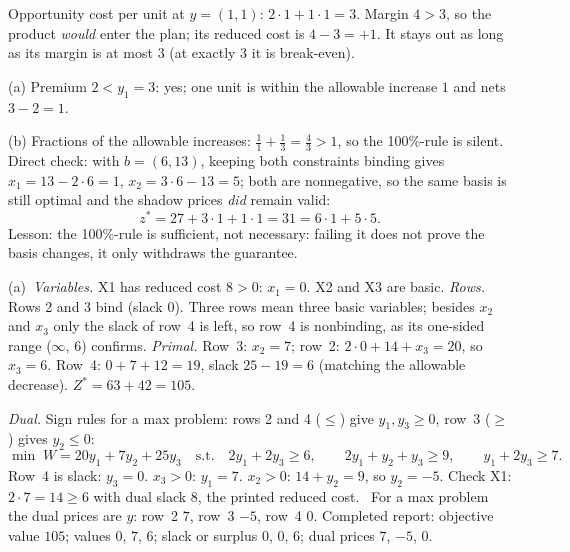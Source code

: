 \begin{solutions}
  \item Opportunity cost per unit at $y=(1,1)$:
        $2\cdot1+1\cdot1=3$. Margin $4>3$, so the product \emph{would}
        enter the plan; its reduced cost is $4-3=+1$. It stays out as
        long as its margin is at most $3$ (at exactly $3$ it is
        break-even).

  \item (a) Premium $2<y_{1}=3$: yes; one unit is within the allowable
        increase $1$ and nets $3-2=1$.

        (b) Fractions of the allowable increases:
        $\tfrac11+\tfrac13=\tfrac43>1$, so the 100\%-rule is silent.
        Direct check: with $b=(6,13)$, keeping both constraints binding
        gives $x_{1}=13-2\cdot6=1$, $x_{2}=3\cdot6-13=5$; both are
        nonnegative, so the same basis is still optimal and the shadow
        prices \emph{did} remain valid:
        \[
          z^{*}=27+3\cdot1+1\cdot1=31=6\cdot1+5\cdot5 .
        \]
        Lesson: the 100\%-rule is sufficient, not necessary: failing
        it does not prove the basis changes, it only withdraws the
        guarantee.

  \item (a)~\emph{Variables.} X1 has reduced cost $8>0$: $x_{1}=0$. X2 and
        X3 are basic. \emph{Rows.} Rows 2 and 3 bind (slack $0$). Three
        rows mean three basic variables; besides $x_{2}$ and $x_{3}$ only
        the slack of row~4 is left, so row~4 is nonbinding, as its
        one-sided range ($\infty$, $6$) confirms.
        \emph{Primal.} Row~3: $x_{2}=7$; row~2: $2\cdot0+14+x_{3}=20$, so
        $x_{3}=6$. Row~4: $0+7+12=19$, slack $25-19=6$ (matching the
        allowable decrease). $Z^{*}=63+42=105$.

        \emph{Dual.} Sign rules for a max problem: rows 2 and 4 ($\le$)
        give $y_{1},y_{3}\ge 0$, row~3 ($\ge$) gives $y_{2}\le 0$:
        \[
          \min\; W=20y_{1}+7y_{2}+25y_{3}
          \quad\text{s.t.}\quad
          2y_{1}+2y_{3}\ge 6,\qquad 2y_{1}+y_{2}+y_{3}\ge 9,\qquad
          y_{1}+2y_{3}\ge 7 .
        \]
        Row~4 is slack: $y_{3}=0$. $x_{3}>0$: $y_{1}=7$. $x_{2}>0$:
        $14+y_{2}=9$, so $y_{2}=-5$. Check X1: $2\cdot7=14\ge 6$ with
        dual slack $8$, the printed reduced cost. \checkmark\ For a max
        problem the dual prices are $y$: row~2 $7$, row~3 $-5$, row~4
        $0$. Completed report: objective value $105$; values
        $0$, $7$, $6$; slack or surplus $0$, $0$, $6$; dual prices $7$,
        $-5$, $0$.


\end{solutions}
